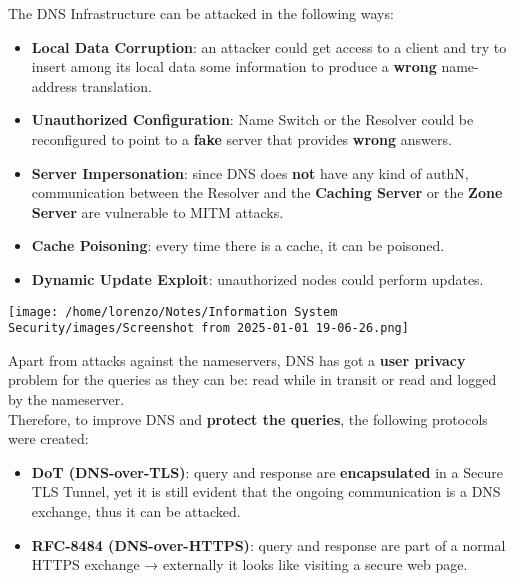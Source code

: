 \noindent
The DNS Infrastructure can be attacked in the following ways:
\\
\begin{minipage}{0.6\textwidth}
	\vspace{0.3cm}
\begin{itemize}
    \item \textbf{Local Data Corruption}: an attacker could get access to a client and try to insert
    among its local data some information to produce a \textbf{wrong} name-address translation.
    \item \textbf{Unauthorized Configuration}: Name Switch or the Resolver could be reconfigured to point to a \textbf{fake} server that provides \textbf{wrong} answers.
    \item \textbf{Server Impersonation}: since DNS does \textbf{not} have any kind of authN, communication
    between the Resolver and the \textbf{Caching Server} or the \textbf{Zone Server} are vulnerable to
    MITM attacks.
    \item \textbf{Cache Poisoning}: every time there is a cache, it can be poisoned.
    \item \textbf{Dynamic Update Exploit}: unauthorized nodes could perform updates.
\end{itemize} 
\end{minipage} 
\hspace{0.3cm}
\begin{minipage}{0.4\textwidth}
    \centering
    \texttt{[image: /home/lorenzo/Notes/Information System Security/images/Screenshot from 2025-01-01 19-06-26.png]}
\end{minipage}

\noindent
Apart from attacks against the nameservers, DNS has got a \textbf{user privacy} problem for the
queries as they can be: read while in transit or read and logged by the nameserver.\\
Therefore, to improve DNS and \textbf{protect the queries}, the following protocols were created:
\begin{itemize}
    \item \textbf{DoT (DNS-over-TLS)}: query and response are \textbf{encapsulated} in a Secure TLS Tunnel,
    yet it is still evident that the ongoing communication is a DNS exchange, thus it can be
    attacked.
    \item \textbf{RFC-8484 (DNS-over-HTTPS)}: query and response are part of a normal HTTPS
    exchange → externally it looks like visiting a secure web page.
\end{itemize}



